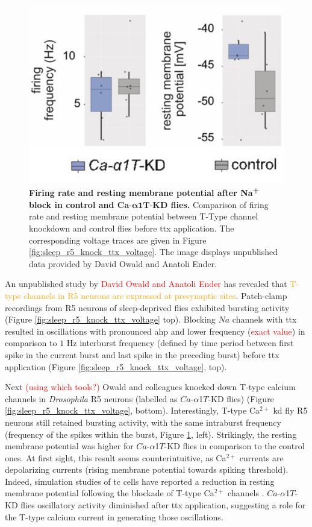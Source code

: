 \documentclass[../main.tex]{subfiles}
\begin{document}
\begin{figure}[!t]
    \centering
    \includegraphics[width=0.5\linewidth]{../img/sleep_and_r5_network/CaaT_knock_and_ttx/frequencies_whole.png}
    \caption[Firing rate and resting membrane potential after $Na$\textsuperscript{+} block in control and $Ca\text{-}\alpha1T\text{-KD}$ flies]{
        \textbf{Firing rate and resting membrane potential after Na\textsuperscript{+} block in control and $\bm{Ca\text{-}\alpha1T\text{-KD}}$ flies.}
        Comparison of firing rate and resting membrane potential between T-Type channel knockdown and control flies before \gls{ttx} application. The corresponding voltage traces are given in Figure \ref{fig:sleep_r5_knock_ttx_voltage}.
        The image displays unpublished data provided by David Owald and Anatoli Ender.
    }
    \label{fig:sleep_r5_knock_ttx_frequencies}
\end{figure}

An unpublished study by \textcolor{red}{David Owald and Anatoli Ender} has revealed that \textcolor{orange}{T-type channels in R5 neurons are expressed at presynaptic sites}.
Patch-clamp recordings from R5 neurons of sleep-deprived flies exhibited bursting activity (Figure \ref{fig:sleep_r5_knock_ttx_voltage} top). Blocking $Na$ channels with \gls{ttx} resulted in oscillations with pronounced \gls{ahp} and lower frequency (\textcolor{red}{exact value}) in comparison to $1$ Hz interburst frequency (defined by time period between first spike in the current burst and last spike in the preceding burst) before \gls{ttx} application (Figure \ref{fig:sleep_r5_knock_ttx_voltage}, top).

Next \textcolor{red}{(using which tools?)} Owald and colleagues knocked down T-type calcium channels in \textit{Drosophila} R5 neurons (labelled as $Ca$-$\alpha$1$T$-KD flies) (Figure \ref{fig:sleep_r5_knock_ttx_voltage}, bottom). Interestingly, T-type Ca$^{2+}$ \gls{kd} fly R5 neurons still retained bursting activity, with the same intraburst frequency (frequency of the spikes within the burst, Figure \ref{fig:sleep_r5_knock_ttx_frequencies}, left). Strikingly, the resting membrane potential was higher for $Ca$-$\alpha$1$T$-KD flies in comparison to the control ones. At first sight, this result seems counterintuitive, as Ca$^{2+}$ currents are depolarizing currents (rising membrane potential towards spiking threshold). Indeed, simulation studies of \gls{tc} cells have reported a reduction in resting membrane potential following the blockade of T-type Ca$^{2+}$ channels \parencite{amarilloInterplaySevenSubthreshold2014}.
$Ca$-$\alpha$1$T$-KD flies oscillatory activity diminished after \gls{ttx} application, suggesting a role for the T-type calcium current in generating those oscillations.
\end{document}
